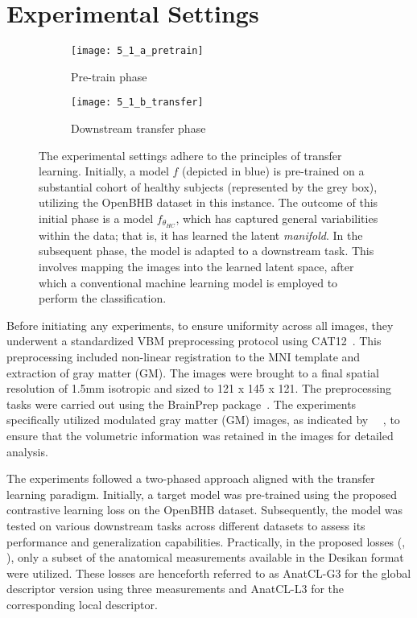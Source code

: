\section{Experimental Settings}
\begin{figure*}
    \begin{subfigure}[t]{.45\linewidth}
        \caption{Pre-train phase}
        \texttt{[image: 5\_1\_a\_pretrain]}
    \end{subfigure}
    \hfill
    \begin{subfigure}[t]{.45\linewidth}
        \caption{Downstream transfer phase}
        \texttt{[image: 5\_1\_b\_transfer]}
    \end{subfigure}
    \caption[Experimental Settings (Transfer Learning)]{
    The experimental settings adhere to the principles of transfer
    learning. Initially, a model $f$ (depicted in blue) is pre-trained on a
    substantial cohort of healthy subjects (represented by the grey box),
    utilizing the OpenBHB dataset in this instance. The outcome of this initial
    phase is a model $f_{\theta_{HC}}$, which has captured general variabilities
    within the data; that is, it has learned the latent \emph{manifold}. In the
    subsequent phase, the model is adapted to a downstream task. This involves
    mapping the images into the learned latent space, after which a conventional
    machine learning model is employed to perform the classification.
    }
    \labfig{}
\end{figure*}
Before initiating any experiments, to ensure uniformity across all images, they
underwent a standardized VBM preprocessing protocol using
CAT12~\cite{gaser_cat_2022}. This preprocessing included non-linear registration
to the MNI template and extraction of gray matter (GM). The images were brought
to a final spatial resolution of 1.5mm isotropic and sized to 121 x 145 x 121.
The preprocessing tasks were carried out using the BrainPrep
package~. The experiments specifically utilized
modulated gray matter (GM) images, as indicated by
~\citeauthor{dufumier_openbhb_2022}~\cite{dufumier_openbhb_2022}, to ensure that
the volumetric information was retained in the images for detailed analysis.

The experiments followed a two-phased approach aligned with the transfer
learning paradigm. Initially, a target model was pre-trained using the proposed
contrastive learning loss on the OpenBHB dataset. Subsequently, the model was
tested on various downstream tasks across different datasets to assess its
performance and generalization capabilities. Practically, in the proposed losses
(, ), only a subset of the anatomical
measurements available in the Desikan format were utilized.
These losses are henceforth referred to as AnatCL-G3 for the global descriptor
version using three measurements and AnatCL-L3 for the corresponding local
descriptor.

